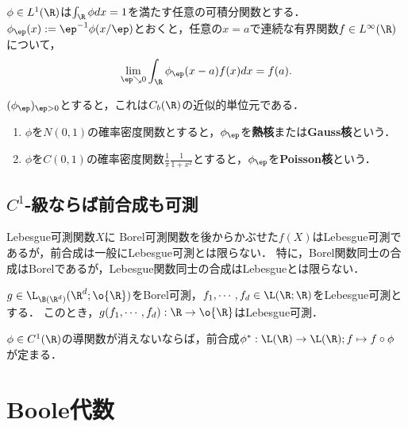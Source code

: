 \documentclass[uplatex, dvipdfmx]{jsreport}
\begin{document}
\begin{theorem}[近似的単位元の存在]
    $\phi\in L^1(\R)$は$\int_\R\phi dx=1$を満たす任意の可積分関数とする．
    $\phi_\ep(x):=\ep^{-1}\phi(x/\ep)$とおくと，任意の$x=a$で連続な有界関数$f\in L^\infty(\R)$について，
    \[\lim_{\ep\searrow0}\int_\R\phi_\ep(x-a)f(x)dx=f(a).\]
\end{theorem}
\begin{remarks}
    $(\phi_\ep)_{\ep>0}$とすると，これは$C_b(\R)$の近似的単位元である．
    \begin{enumerate}
        \item $\phi$を$N(0,1)$の確率密度関数とすると，$\phi_\ep$を\textbf{熱核}または\textbf{Gauss核}という．
        \item $\phi$を$C(0,1)$の確率密度関数$\frac{1}{\pi}\frac{1}{1+x^2}$とすると，$\phi_\ep$を\textbf{Poisson核}という．
    \end{enumerate}
\end{remarks}

\subsection{$C^1$-級ならば前合成も可測}

\begin{tcolorbox}[colframe=ForestGreen, colback=ForestGreen!10!white,breakable,colbacktitle=ForestGreen!40!white,coltitle=black,fonttitle=\bfseries\sffamily,
title=]
    Lebesgue可測関数$X$に
    Borel可測関数を後からかぶせた$f(X)$はLebesgue可測であるが，前合成は一般にLebesgue可測とは限らない．
    特に，Borel関数同士の合成はBorelであるが，Lebesgue関数同士の合成はLebesgueとは限らない．
\end{tcolorbox}


\begin{proposition}[Borel後合成の可測性]
    $g\in\L_{\B(\R^d)}(\R^d;\o{\R})$をBorel可測，$f_1,\cdots,f_d\in\L(\R;\R)$をLebesgue可測とする．
    このとき，$g(f_1,\cdots,f_d):\R\to\o{\R}$はLebesgue可測．
\end{proposition}

\begin{proposition}[Borel前合成が可測になる十分条件]
    $\phi\in C^1(\R)$の導関数が消えないならば，前合成$\phi^*:\L(\R)\to\L(\R);f\mapsto f\circ\phi$が定まる．
\end{proposition}

\section{Boole代数}
\end{document}
